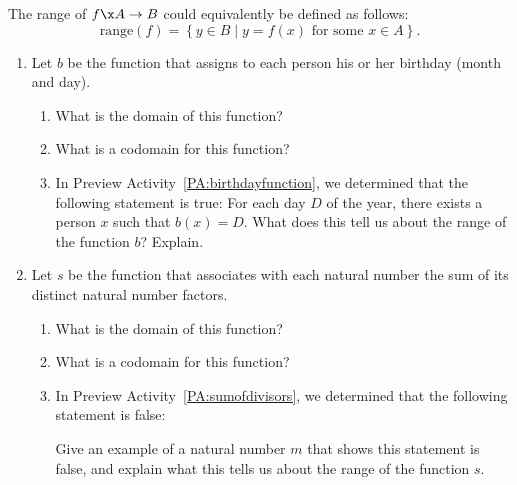 \noindent
The range of  $f\x A \to B $ could equivalently be defined as follows:
\[
\text{range}( f ) = \left\{ { {y \in B} \mid y = f\left( x \right)\text{ for some }x \in A} \right\}\!.
\]
\hbreak
%
\begin{prog} \label{pr:codomainandrange} \hfill 
\begin{enumerate}
\item Let  $b$  be the function that assigns to each person his or her birthday (month and day).
\begin{enumerate}
  \item What is the domain of this function?

  \item What is a codomain for this function?

  \item In Preview Activity~\ref{PA:birthdayfunction}, we determined that the following statement is true:  For each day  $D$  of the year, there exists a person  $x$  such that  
$b( x ) = D$.
What does this tell us about the range of the function  $b$?  Explain.
\end{enumerate}

\item Let  $s$  be the function that associates with each natural number the sum of its distinct natural number factors.

\begin{enumerate}
  \item What is the domain of this function?

  \item What is a codomain for this function?

  \item In Preview Activity~\ref{PA:sumofdivisors}, we determined that the following statement is false:


Give an example of a natural number  $m$  that shows this statement is false, and explain what this tells us about the  range of the function  $s$\!.
\end{enumerate}

\end{enumerate}
\end{prog}
\hbreak
%

